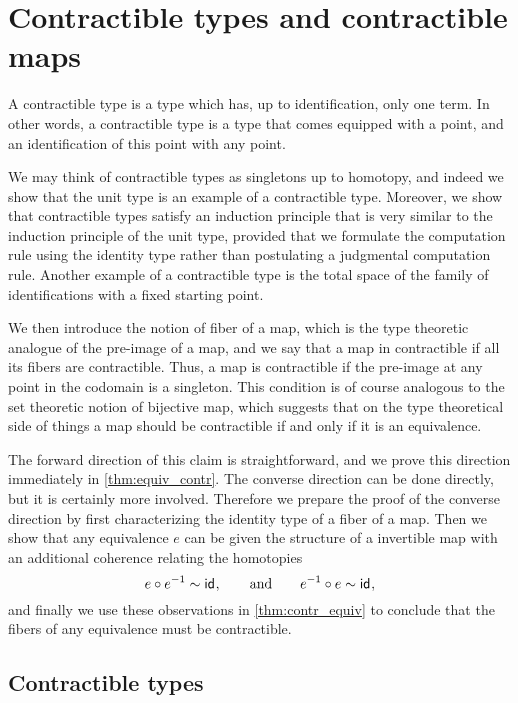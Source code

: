 
\section{Contractible types and contractible maps}

A contractible type is a type which has, up to identification, only one term. In other words, a contractible type is a type that comes equipped with a point, and an identification of this point with any point.

We may think of contractible types as singletons up to homotopy, and indeed we show that the unit type is an example of a contractible type. Moreover, we show that contractible types satisfy an induction principle that is very similar to the induction principle of the unit type, provided that we formulate the computation rule using the identity type rather than postulating a judgmental computation rule. Another example of a contractible type is the total space of the family of identifications with a fixed starting point.

We then introduce the notion of fiber of a map, which is the type theoretic analogue of the pre-image of a map, and we say that a map in contractible if all its fibers are contractible. Thus, a map is contractible if the pre-image at any point in the codomain is a singleton. This condition is of course analogous to the set theoretic notion of bijective map, which suggests that on the type theoretical side of things a map should be contractible if and only if it is an equivalence.

The forward direction of this claim is straightforward, and we prove this direction immediately in \cref{thm:equiv_contr}. The converse direction can be done directly, but it is certainly more involved. Therefore we prepare the proof of the converse direction by first characterizing the identity type of a fiber of a map. Then we show that any equivalence $e$ can be given the structure of a invertible map with an additional coherence relating the homotopies
\begin{equation*}
  e\circ e^{-1}\sim \mathsf{id}_{},\qquad\text{and}\qquad e^{-1}\circ e\sim\mathsf{id}_{},
\end{equation*}
and finally we use these observations in \cref{thm:contr_equiv} to conclude that the fibers of any equivalence must be contractible.

\subsection{Contractible types}

